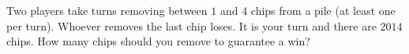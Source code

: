 Two players take turns removing between $1$ and $4$ chips from a pile (at least one per turn). Whoever removes the last chip loses. It is your turn and there are $2014$ chips. How many chips should you remove to guarantee a win?
